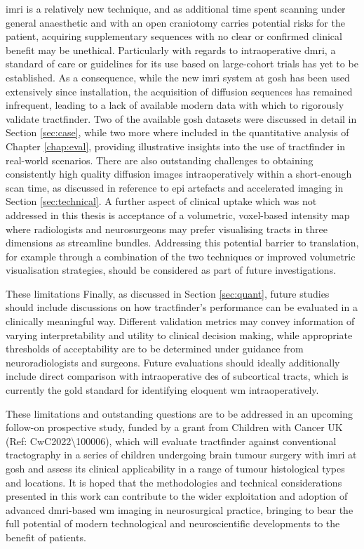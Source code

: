 \documentclass[12pt,phd,a4paper,twoside]{ucl_thesis}
\providecommand{\DIFaddtex}[1]{{\protect\color{blue} \sf #1}} %
\providecommand{\DIFdeltex}[1]{{\protect\color{red} \scriptsize #1}} %
\providecommand{\DIFaddbegin}{} %
\providecommand{\DIFaddend}{} %
\providecommand{\DIFdelbegin}{} %
\providecommand{\DIFdelend}{} %
\providecommand{\DIFadd}[1]{\texorpdfstring{\DIFaddtex{#1}}{#1}} %
\providecommand{\DIFdel}[1]{\texorpdfstring{\DIFdeltex{#1}}{}} %
\newcommand{\DIFscaledelfig}{0.5}
\newlength{\DIFdelgraphicswidth} %
\newlength{\DIFdelgraphicsheight} %
\newcommand{\DIFaddincludegraphics}[2][]{{\color{blue}\fbox{\DIFOincludegraphics[#1]{#2}}}} %
\newcommand{\DIFdelincludegraphics}[2][]{%
\sbox{\DIFdelgraphicsbox}{\DIFOincludegraphics[#1]{#2}}%
\settoboxwidth{\DIFdelgraphicswidth}{\DIFdelgraphicsbox} %
\settoboxtotalheight{\DIFdelgraphicsheight}{\DIFdelgraphicsbox} %
\scalebox{\DIFscaledelfig}{%
\parbox[b]{\DIFdelgraphicswidth}{\usebox{\DIFdelgraphicsbox}\\[-\baselineskip] \rule{\DIFdelgraphicswidth}{0em}}\llap{\resizebox{\DIFdelgraphicswidth}{\DIFdelgraphicsheight}{%
\setlength{\unitlength}{\DIFdelgraphicswidth}%
\begin{picture}(1,1)%
\thicklines\linethickness{2pt} %
{\color[rgb]{1,0,0}\put(0,0){\framebox(1,1){}}}%
{\color[rgb]{1,0,0}\put(0,0){\line( 1,1){1}}}%
{\color[rgb]{1,0,0}\put(0,1){\line(1,-1){1}}}%
\end{picture}%
}\hspace*{3pt}}} %
} %
\DeclareRobustCommand{\DIFaddbegin}{\DIFOaddbegin \let\includegraphics\DIFaddincludegraphics} %
\DeclareRobustCommand{\DIFaddend}{\DIFOaddend \let\includegraphics\DIFOincludegraphics} %
\DeclareRobustCommand{\DIFdelbegin}{\DIFOdelbegin \let\includegraphics\DIFdelincludegraphics} %
\DeclareRobustCommand{\DIFdelend}{\DIFOaddend \let\includegraphics\DIFOincludegraphics} %
\begin{document}
\Gls{imri} is a relatively new technique, and as additional time spent scanning under general anaesthetic and with an open craniotomy carries potential risks for the patient, acquiring supplementary sequences with no clear or confirmed clinical benefit may be unethical.
Particularly with regards to intraoperative \gls{dmri}, a standard of care or guidelines for its use based on large-cohort trials has yet to be established.
As a consequence, while the new \gls{imri} system at \gls{gosh} has been used extensively since installation, the acquisition of diffusion sequences has remained infrequent, leading to a lack of available modern data with which to rigorously validate tractfinder.
Two of the available \gls{gosh} datasets were discussed in detail in Section \ref{sec:case}, while two more where included in the quantitative analysis of Chapter \ref{chap:eval}, providing illustrative insights into the use of tractfinder in real-world scenarios.
There are also outstanding challenges to obtaining consistently high quality diffusion images intraoperatively within a short-enough scan time, as discussed in reference to \gls{epi} artefacts and accelerated imaging in Section \ref{sec:technical}.
A further aspect of clinical uptake which was not addressed in this thesis is acceptance of a volumetric, voxel-based intensity map where radiologists and neurosurgeons may prefer visualising tracts in three dimensions as streamline bundles.
Addressing this potential barrier to translation, for example through a combination of the two techniques or improved volumetric visualisation strategies, should be considered as part of future investigations.

\DIFdelbegin \DIFdel{These limitations }\DIFdelend \DIFaddbegin \DIFadd{Finally, as discussed in Section \ref{sec:quant}, future studies should include discussions on how tractfinder's performance can be evaluated in a clinically meaningful way.
Different validation metrics may convey information of varying interpretability and utility to clinical decision making, while appropriate thresholds of acceptability are to be determined under guidance from neuroradiologists and surgeons.
Future evaluations should ideally additionally include direct comparison with intraoperative }\gls{des} \DIFadd{of subcortical tracts, which is currently the gold standard for identifying eloquent }\gls{wm} \DIFadd{intraoperatively.
}

\DIFadd{These limitations and outstanding questions }\DIFaddend are to be addressed in an upcoming follow-on prospective study, funded by a grant from Children with Cancer UK (Ref: CwC2022\textbackslash 100006), which will evaluate tractfinder against conventional tractography in a series of children undergoing brain tumour surgery with \gls{imri} at \gls{gosh} and assess its clinical applicability in a range of tumour histological types and locations.
It is hoped that the methodologies and technical considerations presented in this work can contribute to the wider exploitation and adoption of advanced \gls{dmri}-based \gls{wm} imaging in neurosurgical practice, bringing to bear the full potential of modern technological and neuroscientific developments to the benefit of patients.
\end{document}
